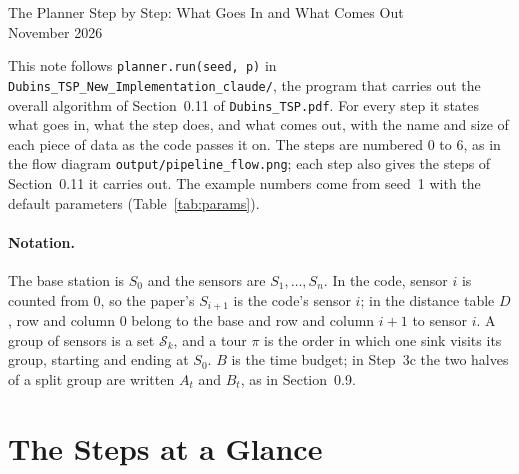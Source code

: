 \documentclass[10pt]{article}
\newcommand{\code}[1]{\texttt{#1}}
\begin{document}
\sloppy

\begin{center}
  {\LARGE The Planner Step by Step: What Goes In and What Comes Out}\\[1.2em]
  {\large November 2026}
\end{center}
\vspace{1em}

{\sloppy
This note follows \code{planner.run(seed, p)} in \code{Dubins\_TSP\_New\_Implementation\_claude/}, the program that
carries out the overall algorithm of Section~0.11 of \code{Dubins\_TSP.pdf}. For every step it states what goes in,
what the step does, and what comes out, with the name and size of each piece of data as the code passes it on. The
steps are numbered 0 to 6, as in the flow diagram \code{output/pipeline\_flow.png}; each step also gives the steps of
Section~0.11 it carries out. The example numbers come from seed~1 with the default parameters (Table~\ref{tab:params}).
\par}

\paragraph{Notation.} The base station is $S_0$ and the sensors are $S_1,\dots,S_n$. In the code, sensor $i$ is counted
from 0, so the paper's $S_{i+1}$ is the code's sensor $i$; in the distance table $D$, row and column $0$ belong to the
base and row and column $i+1$ to sensor $i$. A group of sensors is a set $\mathcal{S}_k$, and a tour $\pi$ is the order
in which one sink visits its group, starting and ending at $S_0$. $B$ is the time budget; in Step~3c the two halves of a
split group are written $A_t$ and $B_t$, as in Section~0.9.

\section{The Steps at a Glance}
\end{document}
